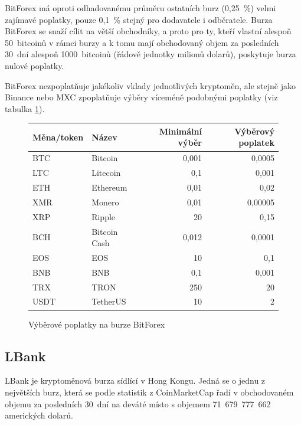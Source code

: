 \documentclass[thesis=B,czech]{FITthesis}[2019/03/21]
\begin{document}
BitForex má oproti odhadovanému průměru ostatních burz (0,25~\%) velmi zajímavé poplatky, pouze 0,1~\% stejný pro dodavatele i odběratele. Burza BitForex se snaží cílit na větší obchodníky, a proto pro ty, kteří vlastní alespoň 50~bitcoinů v rámci burzy a k tomu mají obchodovaný objem za posledních 30~dní alespoň 1000~bitcoinů (řádově jednotky milionů dolarů), poskytuje burza nulové poplatky. 

BitForex nezpoplatňuje jakékoliv vklady jednotlivých kryptoměn, ale stejně jako Binance nebo MXC zpoplatňuje výběry víceméně podobnými poplatky (viz tabulka \ref{bitforex_fees}). \cite{cryptowisser_bitforex}


\begin{figure}\centering
    \begin{center}
     \begin{tabular}{||l | l | r | r||} 
     \hline
     Měna/token & Název & Minimální výběr & Výběrový poplatek \\ [0.5ex] 
     \hline\hline
     BTC & Bitcoin & 0,001 & 0,0005 \\ 
     \hline
     LTC & Litecoin & 0,1 & 0,001 \\
     \hline
     ETH & Ethereum & 0,01 & 0,02 \\
     \hline
     XMR & Monero & 0,01 & 0,00005 \\
     \hline
     XRP & Ripple & 20 & 0,15 \\
     \hline
     BCH & Bitcoin Cash & 0,012 & 0,0001 \\
     \hline
     EOS & EOS & 10 & 0,1 \\
     \hline
     BNB & BNB & 0,1 & 0,001 \\
     \hline
     TRX & TRON & 250 & 20 \\
     \hline
     USDT & TetherUS & 10 & 2 \\ [1ex] 
     \hline
    \end{tabular}
    \end{center}
    \caption{Výběrové poplatky na burze BitForex \cite{bitforex_fees}}
    \label{bitforex_fees}
\end{figure}

\subsection{LBank}
LBank je kryptoměnová burza sídlící v Hong Kongu. Jedná se o jednu z největších burz, která se podle statistik z CoinMarketCap řadí v obchodovaném objemu za posledních 30~dní na deváté místo s objemem 71~679~777~662 amerických dolarů. \cite{coinmarketcap} \cite{cryptowisser_lbank}
\end{document}
